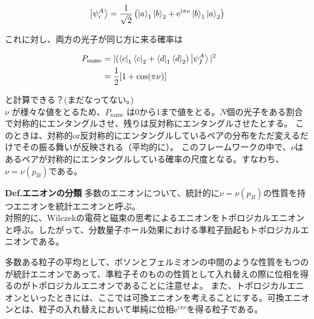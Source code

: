 \documentclass[a4paper,11pt]{jsarticle}
\numberwithin{equation}{section}
\renewcommand{\i}{\mathrm{i}}
\begin{document}
\begin{align}
  \ket{\psi_i^A} = \frac{1}{\sqrt{2}} \left( \ket{a}_1 \ket{b}_2 + \mathrm{e}^{\i \pi \nu} \ket{b}_1 \ket{a}_2 \right)
\end{align}

これに対し、両方の光子が同じ方に来る確率は

\begin{align}
  P_{\mathrm{same}} &= |(\bra{c}_1\bra{c}_2+\bra{d}_1\bra{d}_2)\ket{\psi_f^A}|^2\\
  &=\frac{1}{2}[1+\cos(\pi \nu)] &&
\end{align}

と計算できる？(まだなってない。)\\
$\nu$ が様々な値をとるため、$P_{\mathrm{same}}$ は0から1まで値をとる。$N$個の光子をある割合で対称的にエンタングルさせ、残りは反対称にエンタングルさせたとする。
このときは、対称的or反対称的にエンタングルしているペアの分布をただ変えるだけでその振る舞いが反映される（平均的に）。
このフレームワークの中で、$\nu$はあるペアが対称的にエンタングルしている確率の尺度となる。すなわち、$\nu=\nu(p_B)$である。\\

\begin{itembox}[l]{\textbf{Def.エニオンの分類}}
多数のエニオンについて、統計的に$\nu=\nu(p_B)$の性質を持つエニオンを統計エニオンと呼ぶ。\\
対照的に、Wilczekの電荷と磁束の思考によるエニオンをトポロジカルエニオンと呼ぶ。したがって、分数量子ホール効果における準粒子励起もトポロジカルエニオンである。
\end{itembox}

多数ある粒子の平均として、ボソンとフェルミオンの中間のような性質をもつのが統計エニオンであって、準粒子そのものの性質として入れ替えの際に位相を得るのがトポロジカルエニオンであることに注意せよ。
また、トポロジカルエニオンといったときには、ここでは可換エニオンを考えることにする。可換エニオンとは、粒子の入れ替えにおいて単純に位相$\mathrm{e}^{i\pi\nu}$を得る粒子である。
\end{document}
